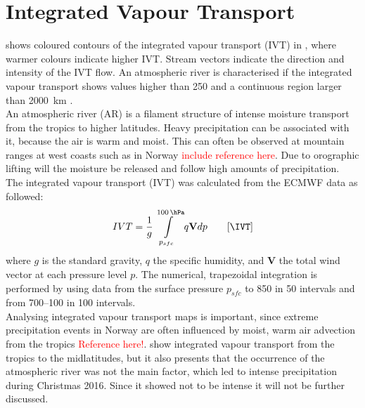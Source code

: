 \section{Integrated Vapour Transport}
\label{sec:atm_riv}
% 
 shows coloured contours of the integrated vapour transport (IVT) in \SI{}{\IVT}, where warmer colours indicate higher IVT. Stream vectors indicate the direction and intensity of the IVT flow. An atmospheric river is characterised if the integrated vapour transport shows values higher than \SI{250}{\IVT} and a continuous region larger than \SI{2000}{\km} \citep{rutz_climatological_2014}.
\\
An atmospheric river (AR) is a filament structure of intense moisture transport from the tropics to higher latitudes. 
Heavy precipitation can be associated with it, because the air is warm and moist. This can often be observed at mountain ranges at west coasts such as in Norway \textcolor{red}{include reference here}. Due to orographic lifting will the moisture be released and follow high amounts of precipitation.  
\\
The integrated vapour transport (IVT) was calculated from the ECMWF data as followed:
\begin{align}
IVT = \frac{1}{g} \int\limits_{p_{sfc}}^{\SI{100}{\hPa}} q \mathbf{V} dp \qquad [\SI{}{\IVT}]
\label{eq:IVT}
\end{align} 
where $g$ is the standard gravity, $q$ the specific humidity, and $\mathbf{V}$ the total wind vector at each pressure level $p$. The numerical, trapezoidal integration is performed by using data from the surface pressure $p_{sfc}$ to \SI{850}{\hPa} in \SI{50}{\hPa} intervals and from \SIrange{700}{100}{\hPa} in \SI{100}{\hPa} intervals.
\\
Analysing integrated vapour transport maps is important, since extreme precipitation events in Norway are often influenced by moist, warm air advection from the tropics \textcolor{red}{Reference here!}.  show integrated vapour transport from the tropics to the midlatitudes, but it also presents that the occurrence of the atmospheric river was not the main factor, which led to intense precipitation during Christmas 2016. Since it showed not to be intense it will not be further discussed.

